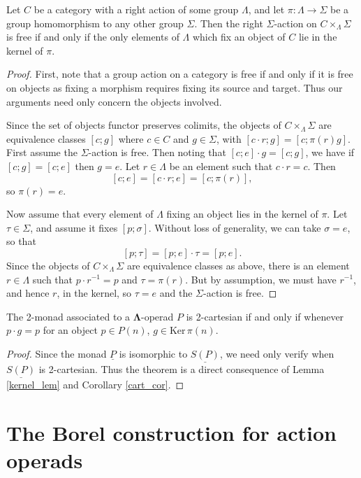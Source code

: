 \documentclass{amsbook} %
\newcommand{\ML}{\mathbf{\Lambda}}
\numberwithin{section}{chapter}
\begin{document}
\begin{lem}\label{kernel_lem}
Let $C$ be a category with a right action of some group $\Lambda$, and let $\pi \colon  \Lambda \rightarrow \Sigma$ be a group homomorphism to any other group $\Sigma$.  Then the right $\Sigma$-action on $C \times_{\Lambda} \Sigma$ is free if and only if the only elements of $\Lambda$ which fix an object of $C$ lie in the kernel of $\pi$.
\end{lem}
\begin{proof}
First, note that a group action on a category is free if and only if it is free on objects as fixing a morphism requires fixing its source and target.  Thus our arguments need only concern the objects involved.

Since the set of objects functor preserves colimits, the objects of $C \times_{\Lambda} \Sigma$ are equivalence classes $[c;g]$ where $c \in C$ and $g \in \Sigma$, with $[c\cdot r;g] = [c; \pi(r)g]$.  First assume the $\Sigma$-action is free.  Then noting that $[c;e]\cdot g =[c;g]$, we have if $[c;g] = [c;e]$ then $g=e$.  Let $r \in \Lambda$ be an element such that $c\cdot r = c$.  Then
  \[
    [c;e] = [c\cdot r; e] = [c; \pi(r)],
  \]
so $\pi(r) = e$.

Now assume that every element of $\Lambda$ fixing an object lies in the kernel of $\pi$.  Let $\tau \in \Sigma$, and assume it fixes $[p; \sigma]$.  Without loss of generality, we can take $\sigma = e$, so that
  \[
    [p; \tau] = [p;e]\cdot \tau = [p;e].
  \]
Since the objects of $C \times_{\Lambda} \Sigma$ are equivalence classes as above, there is an element $r \in \Lambda$ such that $p\cdot r^{-1} = p$ and $\tau = \pi(r)$.  But by assumption, we must have $r^{-1}$, and hence $r$, in the kernel, so $\tau = e$ and the $\Sigma$-action is free.
\end{proof}

\begin{thm}\label{cart_thm}
The 2-monad associated to a $\ML$-operad $P$ is 2-cartesian if and only if whenever $p \cdot g = p$ for an object $p \in P(n)$, $g \in \textrm{Ker} \, \pi (n)$.
\end{thm}
\begin{proof}
Since the monad $\underline{P}$ is isomorphic to $\underline{S(P)}$, we need only verify when $\underline{S(P)}$ is 2-cartesian.  Thus the theorem is a direct consequence of Lemma \ref{kernel_lem} and Corollary \ref{cart_cor}.
\end{proof}

\section{The Borel construction for action operads}
\end{document}
